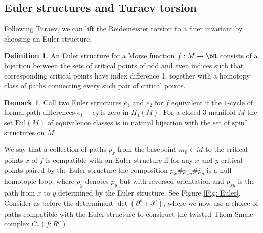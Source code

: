\documentclass[JEP,XML,SOM,Unicode,NoFloatCountersInSection]{cedram}
\newcommand{\Eul}{\mathrm{Eul}}
\newcommand{\spin}{\mathrm{spin}}
\theoremstyle{plain}
\theoremstyle{definition}
\newtheorem{definition}[theorem]{Definition}
\newtheorem{remark}[theorem]{Remark}
\begin{document}
\subsection{Euler structures and Turaev torsion}
Following Turaev, we can lift the Reidemeister torsion to a finer invariant by choosing an Euler structure.

\begin{definition} An Euler structure for a Morse function $f:M \to \bR$ consists of a bijection between the sets of critical points of odd and even indices such that corresponding critical points have index difference 1, together with a homotopy class of paths connecting every such pair of critical points.
\end{definition}

\begin{remark}
Call two Euler structures $e_1$ and $e_2$ for $f$ equivalent if the $1$-cycle of formal path differences $e_1-e_2$ is zero in $H_1(M)$. For a closed 3-manifold $M$ the set $\Eul(M)$ of equivalence classes is in natural bijection with the set of $\spin^c$ structures on $M$.
\end{remark}

We say that a collection of paths $p_x$ from the basepoint $m_0\in M$ to the critical points $x$ of $f$ is compatible with an Euler structure if for any $x$ and $y$ critical points paired by the Euler structure the composition $p_x \# p_{xy} \# \overline{p}_y $ is a null homotopic loop, where $\overline{p}_y$ denotes $p_y$ but with reversed orientation and $p_{xy}$ is the path from $x$ to $y$ determined by the Euler structure. See Figure \ref{Fig: Euler}. Consider as before the determinant $\det(\partial^\rho + \delta^\rho)$, where we now use a choice of paths compatible with the Euler structure to construct the twisted Thom-Smale complex $C_*(f; R^\rho)$.
\end{document}
